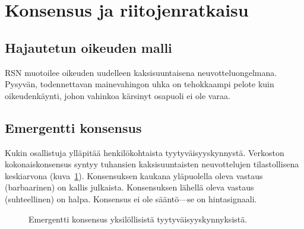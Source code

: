 \documentclass[11pt,a4paper,twocolumn]{article}
\begin{document}
\section{Konsensus ja riitojenratkaisu}

\subsection{Hajautetun oikeuden malli}

RSN muotoilee oikeuden uudelleen kaksisuuntaisena neuvotteluongelmana. Pysyvän, todennettavan mainevahingon uhka on tehokkaampi pelote kuin oikeudenkäynti, johon vahinkoa kärsinyt osapuoli ei ole varaa.

\subsection{Emergentti konsensus}

Kukin osallistuja ylläpitää henkilökohtaista tyytyväisyyskynnystä. Verkoston kokonaiskonsensus syntyy tuhansien kaksisuuntaisten neuvottelujen tilastollisena keskiarvona (kuva~\ref{fig:consensus}). Konsensuksen kaukana yläpuolella oleva vastaus (barbaarinen) on kallis julkaista. Konsensuksen lähellä oleva vastaus (suhteellinen) on halpa. Konsensus ei ole sääntö---se on hintasignaali.

\begin{figure}[ht]
\centering
{}
\caption{Emergentti konsensus yksilöllisistä tyytyväisyyskynnyksistä.}
\label{fig:consensus}
\end{figure}
\end{document}
